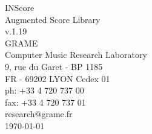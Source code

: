 \documentclass[a4paper]{book}
\begin{document}
\begin{titlepage}
\vspace*{7cm}
\begin{center}
{\huge INScore\\ Augmented Score Library \\[1ex]\large v.1.19}\\
\vspace*{2cm}
{\large GRAME \\ Computer Music Research Laboratory}\\
\vspace*{0.5cm}
{\small 9, rue du Garet - BP 1185}\\
{\small FR - 69202 LYON Cedex 01}\\
\vspace*{0.5cm}
{\small ph:  +33 4 720 737 00}\\
{\small fax: +33 4 720 737 01}\\
\vspace*{0.5cm}
{\small research@grame.fr}\\
\vspace*{0.5cm}
\today 
\end{center}
\end{titlepage}
\clearemptydoublepage
{}
\tableofcontents
\clearemptydoublepage
{}
\end{document}
